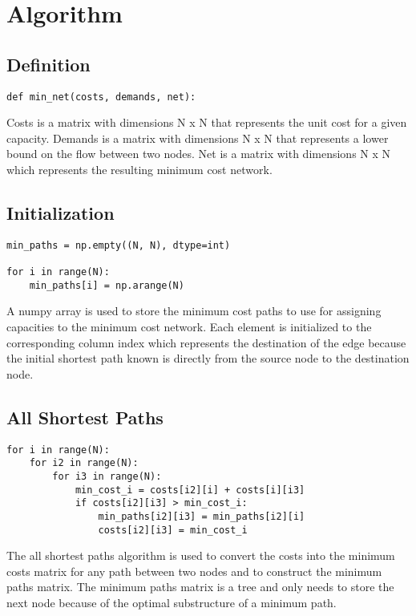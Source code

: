 \documentclass{article}
\begin{document}
\section{Algorithm}
\subsection{Definition}
\begin{verbatim}
def min_net(costs, demands, net):
\end{verbatim}
Costs is a matrix with dimensions N x N that represents the unit cost for a given capacity. Demands is a matrix with dimensions N x N that represents a lower bound on the flow between two nodes. Net is a matrix with dimensions N x N which represents the resulting minimum cost network.

\subsection{Initialization}
\begin{verbatim}
min_paths = np.empty((N, N), dtype=int)

for i in range(N):
    min_paths[i] = np.arange(N)
\end{verbatim}
A numpy array is used to store the minimum cost paths to use for assigning capacities to the minimum cost network. Each element is initialized to the corresponding column index which represents the destination of the edge because the initial shortest path known is directly from the source node to the destination node.

\subsection{All Shortest Paths}
\begin{verbatim}
for i in range(N): 
    for i2 in range(N):
        for i3 in range(N):
            min_cost_i = costs[i2][i] + costs[i][i3]
            if costs[i2][i3] > min_cost_i:
                min_paths[i2][i3] = min_paths[i2][i]
                costs[i2][i3] = min_cost_i
\end{verbatim}
The all shortest paths algorithm is used to convert the costs into the minimum costs matrix for any path between two nodes and to construct the minimum paths matrix. The minimum paths matrix is a tree and only needs to store the next node because of the optimal substructure of a minimum path.
\end{document}
